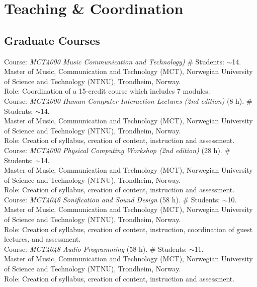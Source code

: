 \documentclass[10pt, a4paper]{article}
\newcommand{\years}[1]{\marginnote{\scriptsize #1}}
\begin{document}
{{%
\section*{Teaching \& Coordination}

\subsection*{Graduate Courses}
\noindent

\years{10/2019}Course: \emph{MCT4000 Music Communication and Technology)} \# Students: $\sim$14. \\
Master of Music, Communication and Technology (MCT), Norwegian University of Science and Technology (NTNU), Trondheim, Norway.\\ 
Role: Coordination of a 15-credit course which includes 7 modules.\\
\years{10/2019}Course: \emph{MCT4000 Human-Computer Interaction Lectures (2nd edition)} (8 h). \# Students: $\sim$14. \\
Master of Music, Communication and Technology (MCT), Norwegian University of Science and Technology (NTNU), Trondheim, Norway.\\ 
Role: Creation of syllabus, creation of content, instruction and assessment.\\
\years{10/2019}Course: \emph{MCT4000 Physical Computing Workshop (2nd edition)} (28 h). \# Students: $\sim$14. \\
Master of Music, Communication and Technology (MCT), Norwegian University of Science and Technology (NTNU), Trondheim, Norway.\\ 
Role: Creation of syllabus, creation of content, instruction and assessment.\\
\years{1/2019}Course: \emph{MCT4046 Sonification and Sound Design} (58 h). \# Students: $\sim$10. \\
Master of Music, Communication and Technology (MCT), Norwegian University of Science and Technology (NTNU), Trondheim, Norway.\\ 
Role: Creation of syllabus, creation of content, instruction, coordination of guest lectures, and assessment.\\
\years{1/2019}Course: \emph{MCT4048 Audio Programming} (58 h). \# Students: $\sim$11. \\
Master of Music, Communication and Technology (MCT), Norwegian University of Science and Technology (NTNU), Trondheim, Norway.\\ 
Role: Creation of syllabus, creation of content, instruction and assessment.\\
}}
\end{document}

